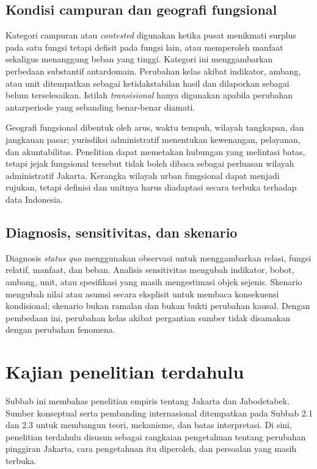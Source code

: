 \documentclass[11pt,a4paper,oneside,openany,indonesian]{report}
\begin{document}
\subsection{Kondisi campuran dan geografi fungsional}

Kategori campuran atau \textit{contested} digunakan ketika pusat menikmati surplus pada satu fungsi tetapi defisit pada fungsi lain, atau memperoleh manfaat sekaligus menanggung beban yang tinggi. Kategori ini menggambarkan perbedaan substantif antardomain. Perubahan kelas akibat indikator, ambang, atau unit ditempatkan sebagai ketidakstabilan hasil dan dilaporkan sebagai belum terselesaikan. Istilah \textit{transisional} hanya digunakan apabila perubahan antarperiode yang sebanding benar-benar diamati.

Geografi fungsional dibentuk oleh arus, waktu tempuh, wilayah tangkapan, dan jangkauan pasar; yurisdiksi administratif menentukan kewenangan, pelayanan, dan akuntabilitas. Penelitian dapat memetakan hubungan yang melintasi batas, tetapi jejak fungsional tersebut tidak boleh dibaca sebagai perluasan wilayah administratif Jakarta. Kerangka wilayah urban fungsional dapat menjadi rujukan, tetapi definisi dan unitnya harus diadaptasi secara terbuka terhadap data Indonesia.

\subsection{Diagnosis, sensitivitas, dan skenario}

Diagnosis \textit{status quo} menggunakan observasi untuk menggambarkan relasi, fungsi relatif, manfaat, dan beban. Analisis sensitivitas mengubah indikator, bobot, ambang, unit, atau spesifikasi yang masih mengestimasi objek sejenis. Skenario mengubah nilai atau asumsi secara eksplisit untuk membaca konsekuensi kondisional; skenario bukan ramalan dan bukan bukti perubahan kausal. Dengan pembedaan ini, perubahan kelas akibat pergantian sumber tidak disamakan dengan perubahan fenomena.

\section{Kajian penelitian terdahulu}

Subbab ini membahas penelitian empiris tentang Jakarta dan Jabodetabek. Sumber konseptual serta pembanding internasional ditempatkan pada Subbab 2.1 dan 2.3 untuk membangun teori, mekanisme, dan batas interpretasi. Di sini, penelitian terdahulu disusun sebagai rangkaian pengetahuan tentang perubahan pinggiran Jakarta, cara pengetahuan itu diperoleh, dan persoalan yang masih terbuka.
\end{document}
